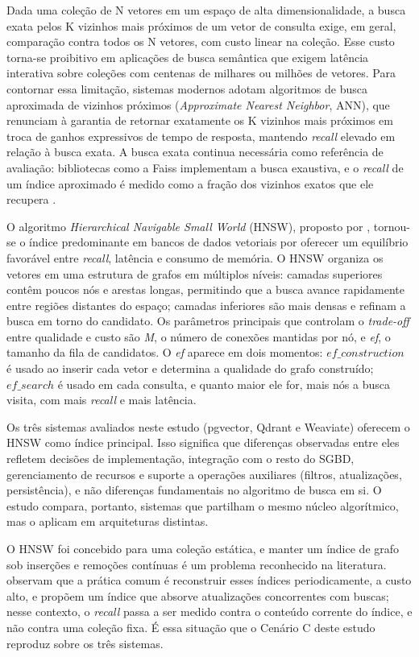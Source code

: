 Dada uma coleção de N vetores em um espaço de alta dimensionalidade, a busca exata pelos K vizinhos mais próximos de um vetor de consulta exige, em geral, comparação contra todos os N vetores, com custo linear na coleção. Esse custo torna-se proibitivo em aplicações de busca semântica que exigem latência interativa sobre coleções com centenas de milhares ou milhões de vetores. Para contornar essa limitação, sistemas modernos adotam algoritmos de busca aproximada de vizinhos próximos (\textit{Approximate Nearest Neighbor}, ANN), que renunciam à garantia de retornar exatamente os K vizinhos mais próximos em troca de ganhos expressivos de tempo de resposta, mantendo \textit{recall} elevado em relação à busca exata. A busca exata continua necessária como referência de avaliação: bibliotecas como a Faiss implementam a busca exaustiva, e o \textit{recall} de um índice aproximado é medido como a fração dos vizinhos exatos que ele recupera \cite{douze2026faiss}.

O algoritmo \textit{Hierarchical Navigable Small World} (HNSW), proposto por , tornou-se o índice predominante em bancos de dados vetoriais por oferecer um equilíbrio favorável entre \textit{recall}, latência e consumo de memória. O HNSW organiza os vetores em uma estrutura de grafos em múltiplos níveis: camadas superiores contêm poucos nós e arestas longas, permitindo que a busca avance rapidamente entre regiões distantes do espaço; camadas inferiores são mais densas e refinam a busca em torno do candidato. Os parâmetros principais que controlam o \textit{trade-off} entre qualidade e custo são \textit{M}, o número de conexões mantidas por nó, e \textit{ef}, o tamanho da fila de candidatos. O \textit{ef} aparece em dois momentos: $ef\_construction$ é usado ao inserir cada vetor e determina a qualidade do grafo construído; $ef\_search$ é usado em cada consulta, e quanto maior ele for, mais nós a busca visita, com mais \textit{recall} e mais latência.

Os três sistemas avaliados neste estudo (pgvector, Qdrant e Weaviate) oferecem o HNSW como índice principal. Isso significa que diferenças observadas entre eles refletem decisões de implementação, integração com o resto do SGBD, gerenciamento de recursos e suporte a operações auxiliares (filtros, atualizações, persistência), e não diferenças fundamentais no algoritmo de busca em si. O estudo compara, portanto, sistemas que partilham o mesmo núcleo algorítmico, mas o aplicam em arquiteturas distintas.

O HNSW foi concebido para uma coleção estática, e manter um índice de grafo sob inserções e remoções contínuas é um problema reconhecido na literatura.  observam que a prática comum é reconstruir esses índices periodicamente, a custo alto, e propõem um índice que absorve atualizações concorrentes com buscas; nesse contexto, o \textit{recall} passa a ser medido contra o conteúdo corrente do índice, e não contra uma coleção fixa. É essa situação que o Cenário C deste estudo reproduz sobre os três sistemas.

